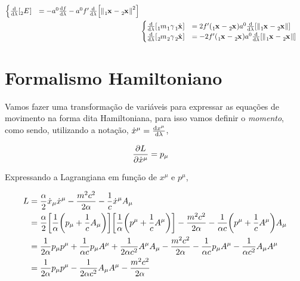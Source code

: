 \documentclass[twoside]{amsart}
\numberwithin{equation}{section}
\begin{document}
\begin{align}
\begin{cases}
        \dv{}{\lambda}\qty[\tensor[_2]{E}{}]&=-\tensor[]{a}{^0}\dv{f}{\lambda}-\tensor[]{a}{^0}{f'}\dv{}{\lambda}\qty[\norm{\tensor[_1]{\vb{x}}{}-\tensor[_2]{\vb{x}}{}}^2]
    \end{cases}\\
    &\begin{cases}
        \dv{}{\lambda}\qty[\tensor[_1]{m}{}\tensor[_1]{\gamma}{}\tensor[_1]{\dot{\vb{x}}}{}]&=2{f'}\qty(\tensor[_1]{\vb{x}}{}-\tensor[_2]{\vb{x}}{})a^0\dv{}{\lambda}\qty[\norm{\tensor[_1]{\vb{x}}{}-\tensor[_2]{\vb{x}}{}}]\\
        \dv{}{\lambda}\qty[\tensor[_2]{m}{}\tensor[_2]{\gamma}{}\tensor[_2]{\dot{\vb{x}}}{}]&=-2{f'}\qty(\tensor[_1]{\vb{x}}{}-\tensor[_2]{\vb{x}}{})a^0\dv{}{\lambda}\qty[\norm{\tensor[_1]{\vb{x}}{}-\tensor[_2]{\vb{x}}{}}]
    \end{cases}
\end{align}



\section{Formalismo Hamiltoniano}

Vamos fazer uma transformação de variáveis para expressar as equações de movimento na forma dita Hamiltoniana, para isso vamos definir o \emph{momento}, como sendo, utilizando a notação, ${\dot x}^\mu=\dv{x^\mu}{\lambda}$,

\begin{align}
    \pdv{L}{{\dot x}^\mu}&=p_\mu
\end{align}

Expressando a Lagrangiana em função de $x^\mu$ e $p^\mu$,

\begin{align}
    L&=\frac\alpha2{\dot x}_\mu{\dot x}^\mu-\frac{m^2c^2}{2\alpha}-\frac1c{\dot x}^\mu A_\mu\\
    &=\frac\alpha2\qty[\frac1\alpha\qty(p_\mu+\frac1c A_\mu)]\qty[\frac1\alpha\qty(p^\mu+\frac1c A^\mu)]-\frac{m^2c^2}{2\alpha}-\frac{1}{\alpha c}\qty(p^\mu +\frac1c A^\mu)A_\mu\\
    &=\frac{1}{2\alpha}p_\mu p^\mu+\frac{1}{\alpha c}p_\mu A^\mu+\frac{1}{2\alpha c^2}A^\mu A_\mu-\frac{m^2c^2}{2\alpha}-\frac{1}{\alpha c}p_\mu A^\mu -\frac{1}{\alpha c^2}A_\mu A^\mu\\
    &=\frac{1}{2\alpha}p_\mu p^\mu-\frac{1}{2\alpha c^2}A_\mu A^\mu-\frac{m^2c^2}{2\alpha}
\end{align}
\end{document}
